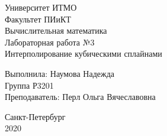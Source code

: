 \newpage
\thispagestyle{empty}
\begin{center}

Университет ИТМО\\
\vspace{1cm}
Факультет ПИиКТ \\
 \vspace{10cm}
Вычислительная математика \\
 \vspace{1em}
Лабораторная работа №3 \\
 \vspace{1em}
Интерполирование кубическими сплайнами\\
\vspace{5cm}
\end{center}
\begin{flushright}
Выполнила: Наумова Надежда \\
Группа Р3201 \\
Преподаватель: Перл Ольга Вячеславовна \\
\end{flushright}
\vspace{3.5cm}
\begin{center}
Санкт-Петербург \\ 
2020
\end{center}
